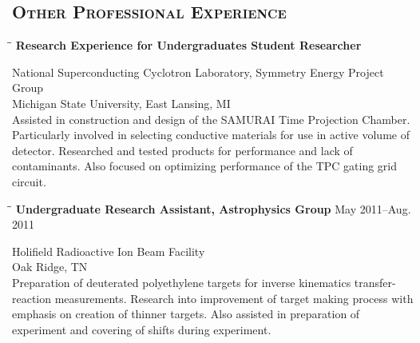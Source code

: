\documentclass[10pt]{res} %
\begin{document}
\begin{resume}

\section{\textsc{Other Professional Experience}}
\vspace{-0.1in}
\begin{tabbing}
\hspace{2.3in}\= \hspace{2.5in}\= \kill %
  \textbf{Research Experience for Undergraduates Student Researcher} \>
\end{tabbing}\vspace{-20pt}      %
National Superconducting Cyclotron Laboratory, Symmetry Energy Project Group \\
Michigan State University, East Lansing, MI \\
Assisted in construction and design of the SAMURAI Time Projection Chamber. 
Particularly involved in selecting conductive materials for use in active 
volume of detector. Researched and tested products for performance and lack 
of contaminants. Also focused on optimizing performance of the TPC gating grid circuit.

\vspace{-0.1in}
\begin{tabbing}
\hspace{2.3in}\= \hspace{2.5in}\= \kill %
\textbf{Undergraduate Research Assistant, Astrophysics Group} \>\> May 2011--Aug. 2011
\end{tabbing}\vspace{-20pt}      %
Holifield Radioactive Ion Beam Facility \\
Oak Ridge, TN \\
Preparation of deuterated polyethylene targets for inverse kinematics 
transfer-reaction measurements. Research into improvement of 
target making process with emphasis on creation of thinner targets. 
Also assisted in preparation of experiment and covering of shifts 
during experiment.


\end{resume}
\end{document}
